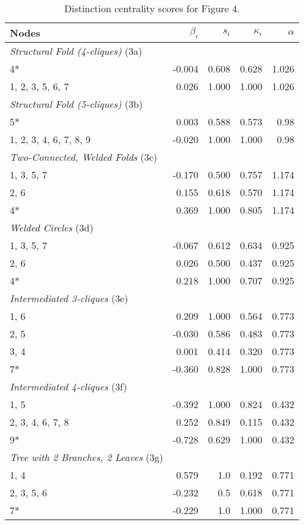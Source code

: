\begin{table}
\footnotesize
\centering
\caption{\label{tab:star}Distinction centrality scores for Figure 4.}
\centering
\begin{tabular}[t]{lrrrr}
Nodes & $\beta_i$ & $s_i$ & $\kappa_i$ & $\alpha$\\
\toprule
\midrule
\textit{Structural Fold (4-cliques)} (3a)\\
4* & -0.004 & 0.608 & 0.628 & 1.026\\
1, 2, 3, 5, 6, 7 & 0.026 & 1.000 & 1.000 & 1.026\\
\midrule
\midrule
\textit{Structural Fold (5-cliques)} (3b)\\
5* & 0.003 & 0.588 & 0.573 & 0.98\\
1, 2, 3, 4, 6, 7, 8, 9 & -0.020 & 1.000 & 1.000 & 0.98\\
\midrule
\midrule
\textit{Two-Connected, Welded Folds} (3c)\\
1, 3, 5, 7 & -0.170 & 0.500 & 0.757 & 1.174\\
2, 6 & 0.155 & 0.618 & 0.570 & 1.174\\
4* & 0.369 & 1.000 & 0.805 & 1.174\\
\midrule
\midrule
\textit{Welded Circles} (3d)\\
1, 3, 5, 7 & -0.067 & 0.612 & 0.634 & 0.925\\
2, 6 & 0.026 & 0.500 & 0.437 & 0.925\\
4* & 0.218 & 1.000 & 0.707 & 0.925\\
\midrule
\midrule
\textit{Intermediated 3-cliques} (3e)\\
1, 6 & 0.209 & 1.000 & 0.564 & 0.773\\
2, 5 & -0.030 & 0.586 & 0.483 & 0.773\\
3, 4 & 0.001 & 0.414 & 0.320 & 0.773\\
7* & -0.360 & 0.828 & 1.000 & 0.773\\
\midrule
\midrule
\textit{Intermediated 4-cliques} (3f)\\
1, 5 & -0.392 & 1.000 & 0.824 & 0.432\\
2, 3, 4, 6, 7, 8 & 0.252 & 0.849 & 0.115 & 0.432\\
9* & -0.728 & 0.629 & 1.000 & 0.432\\
\midrule
\midrule
\textit{Tree with 2 Branches, 2 Leaves} (3g)\\
1, 4 & 0.579 & 1.0 & 0.192 & 0.771\\
2, 3, 5, 6 & -0.232 & 0.5 & 0.618 & 0.771\\
7* & -0.229 & 1.0 & 1.000 & 0.771\\

\end{tabular}
\end{table}
